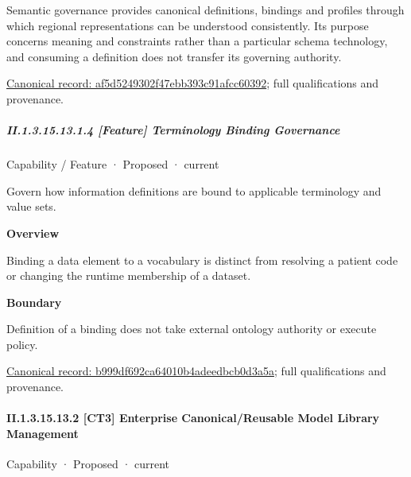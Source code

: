 Semantic governance provides canonical definitions, bindings and profiles through which regional representations can be understood consistently. Its purpose concerns meaning and constraints rather than a particular schema technology, and consuming a definition does not transfer its governing authority.


{\footnotesize \href{../../../../continuum/strategy/capability/feature/af5d5249302f47ebb393c91afcc60392.md}{Canonical record: af5d5249302f47ebb393c91afcc60392}; full qualifications and provenance.}\par
\subparagraph*{II.1.3.15.13.1.4 [Feature] Terminology Binding Governance}
\label{navigation:II.1.3.15.13.1.4}

\label{element:b999df692ca64010b4adeedbcb0d3a5a}
{\small Capability / Feature · Proposed · current}\par

Govern how information definitions are bound to applicable terminology and value sets.



\textbf{Overview}



Binding a data element to a vocabulary is distinct from resolving a patient code or changing the runtime membership of a dataset.



\textbf{Boundary}



Definition of a binding does not take external ontology authority or execute policy.


{\footnotesize \href{../../../../continuum/strategy/capability/feature/b999df692ca64010b4adeedbcb0d3a5a.md}{Canonical record: b999df692ca64010b4adeedbcb0d3a5a}; full qualifications and provenance.}\par
\paragraph*{II.1.3.15.13.2 [CT3] Enterprise Canonical/Reusable Model Library Management}
\label{navigation:II.1.3.15.13.2}

\label{element:76943b4b68644c4dac1368fce8bb20d9}
{\small Capability · Proposed · current}\par


